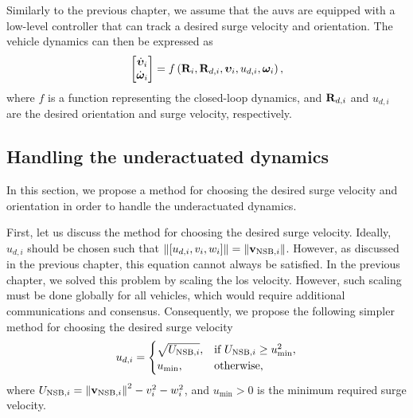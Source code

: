 Similarly to the previous chapter, we assume that the \glspl{auv} are equipped with a low-level controller that can track a desired surge velocity and orientation.
The vehicle dynamics can then be expressed as
\begin{equation}
    \begin{bmatrix}
        \dot{\bm{\upsilon}}_i \\ \dot{\bm{\omega}}_i
    \end{bmatrix}
    = f\left(\mathbf{R}_i, \mathbf{R}_{d,i}, \bm{\upsilon}_i, u_{d, i}, \bm{\omega}_i\right),
\end{equation}
where $f$ is a function representing the closed-loop dynamics, and $\mathbf{R}_{d,i}$ and $u_{d, i}$ are the desired orientation and surge velocity, respectively.

\subsection{Handling the underactuated dynamics}
In this section, we propose a method for choosing the desired surge velocity and orientation in order to handle the underactuated dynamics.

First, let us discuss the method for choosing the desired surge velocity.
Ideally, $u_{d, i}$ should be chosen such that $\left\|\left[u_{d, i}, v_i, w_i\right]\right\| = \left\|\mathbf{v}_{{\rm NSB}, i}\right\|$.
However, as discussed in the previous chapter, this equation cannot always be satisfied.
In the previous chapter, we solved this problem by scaling the \gls{los} velocity.
However, such scaling must be done globally for all vehicles, which would require additional communications and consensus.
Consequently, we propose the following simpler method for choosing the desired surge velocity
\begin{equation}
    u_{d, i} = 
    \begin{cases}
        \sqrt{U_{{\rm NSB}, i}}, & \text{if } U_{{\rm NSB}, i} \geq u_{\min}^2, \\
        u_{\min}, & \text{otherwise},
    \end{cases}
    \label{eq:distr_NSB_u_d_i}
\end{equation}
where $U_{{\rm NSB}, i} = \left\|\mathbf{v}_{{\rm NSB}, i}\right\|^2 - v_i^2 - w_i^2$, and $u_{\min} > 0$ is the minimum required surge velocity.

